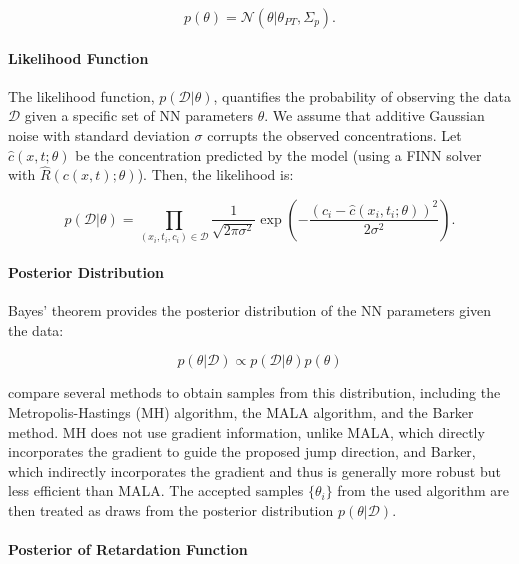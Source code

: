 \begin{equation*}
p(\theta) = \mathcal{N}(\theta | \theta_{PT}, \Sigma_p) .
\end{equation*}

\paragraph{Likelihood Function}

The likelihood function, $p(\mathcal{D} | \theta)$, quantifies the probability of observing the data $\mathcal{D}$ given a specific set of NN parameters $\theta$. We assume that additive Gaussian noise with standard deviation $\sigma$ corrupts the observed concentrations. Let $\hat{c}(x,t;\theta)$ be the concentration predicted by the model (using a FINN solver with $\hat{R}(c(x,t);\theta)$). Then, the likelihood is:

\begin{equation}
p(\mathcal{D} | \theta) = \prod_{(x_i, t_i, c_i) \in \mathcal{D}} \frac{1}{\sqrt{2\pi \sigma^2}} \exp \left( -\frac{(c_i - \hat{c}(x_i,t_i;\theta))^2}{2\sigma^2} \right) .
\label{eq:likelihood}
\end{equation}

\paragraph{Posterior Distribution}

Bayes' theorem provides the posterior distribution of the NN parameters given the data:


\begin{equation*}
p(\theta | \mathcal{D}) \propto p(\mathcal{D} | \theta) p(\theta)
\end{equation*}

\citet{finn} compare several methods to obtain samples from this distribution, including the Metropolis-Hastings (MH) algorithm, the MALA algorithm, and the Barker method. MH does not use gradient information, unlike MALA, which directly incorporates the gradient to guide the proposed jump direction, and Barker, which indirectly incorporates the gradient and thus is generally more robust but less efficient than MALA.
The accepted samples $\{\theta_i\}$ from the used algorithm are then treated as draws from the posterior distribution $p(\theta | \mathcal{D})$.

\paragraph{Posterior of Retardation Function}

